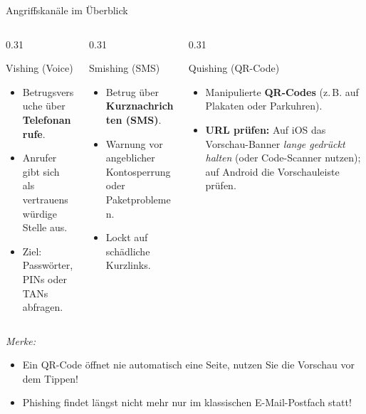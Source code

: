 \documentclass[10pt, aspectratio=169]{beamer}
\begin{document}
\begin{frame}{Angriffskanäle im Überblick}
  \pause
  \begin{columns}[T]
    \begin{column}{0.31\textwidth}
      \begin{block}{Vishing (Voice)}
        \small
        \begin{itemize}
          \item Betrugsversuche über \textbf{Telefonanrufe}.
          \item Anrufer gibt sich als vertrauenswürdige Stelle aus.
          \item Ziel: Passwörter, PINs oder TANs abfragen.
        \end{itemize}
      \end{block}
    \end{column}

    \pause
    \begin{column}{0.31\textwidth}
      \begin{block}{Smishing (SMS)}
        \small
        \begin{itemize}
          \item Betrug über \textbf{Kurznachrichten (SMS)}.
          \item Warnung vor angeblicher Kontosperrung oder Paketproblemen.
          \item Lockt auf schädliche Kurzlinks.
        \end{itemize}
      \end{block}
    \end{column}

  \pause
    \begin{column}{0.31\textwidth}
      \begin{block}{Quishing (QR-Code)}
        \small
        \begin{itemize}
          \item Manipulierte \textbf{QR-Codes} (z.\,B. auf Plakaten oder Parkuhren).
          \item \textbf{URL prüfen:} Auf iOS das Vorschau-Banner \textit{lange gedrückt halten} (oder Code-Scanner nutzen); auf Android die Vorschauleiste prüfen.
        \end{itemize}
      \end{block}
    \end{column}
  \end{columns}
  \pause
  \vspace{0.8em}
  \centering
  \textit{Merke:}
  \pause
  \begin{itemize}
    \item Ein QR-Code öffnet nie automatisch eine Seite, nutzen Sie die Vorschau vor dem Tippen!
    \item Phishing findet längst nicht mehr nur im klassischen E-Mail-Postfach statt!
  \end{itemize}
\end{frame}
\end{document}
